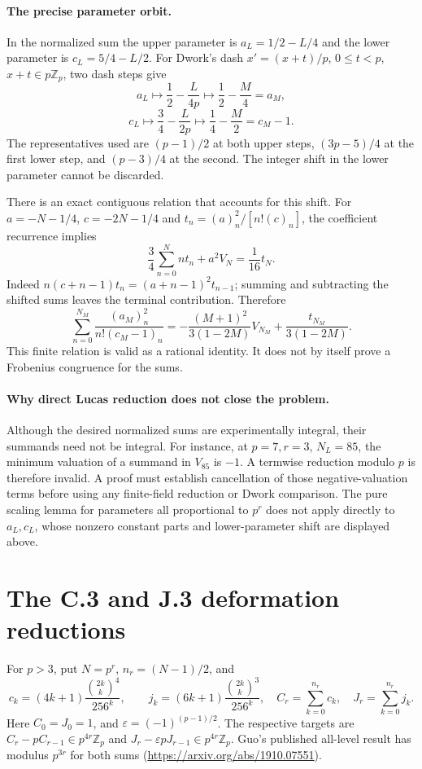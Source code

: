 \documentclass[11pt,letterpaper]{article}
\numberwithin{equation}{section}
\begin{document}
\paragraph{The precise parameter orbit.}
In the normalized sum the upper parameter is
$a_L=1/2-L/4$ and the lower parameter is $c_L=5/4-L/2$.
For Dwork's dash $x'=(x+t)/p$, $0\le t<p$, $x+t\in p\mathbb Z_p$,
two dash steps give
\[
 a_L\longmapsto\frac12-\frac{L}{4p}
     \longmapsto\frac12-\frac{M}{4}=a_M,
\]
\[
 c_L\longmapsto\frac34-\frac{L}{2p}
     \longmapsto\frac14-\frac{M}{2}=c_M-1.
\]
The representatives used are $(p-1)/2$ at both upper steps,
$(3p-5)/4$ at the first lower step, and $(p-3)/4$ at the second.
The integer shift in the lower parameter cannot be discarded.

There is an exact contiguous relation that accounts for this shift.
For $a=-N-1/4$, $c=-2N-1/4$ and
$t_n=(a)_n^2/[n!(c)_n]$, the coefficient recurrence implies
\[
 \frac34\sum_{n=0}^N n t_n+a^2V_N=\frac1{16}t_N.
\]
Indeed $n(c+n-1)t_n=(a+n-1)^2t_{n-1}$; summing and subtracting
the shifted sums leaves the terminal contribution.
Therefore
\begin{equation}\label{II-eq:F-contiguous}
 \sum_{n=0}^{N_M}\frac{(a_M)_n^2}{n!(c_M-1)_n}
 =-\frac{(M+1)^2}{3(1-2M)}V_{N_M}
   +\frac{t_{N_M}}{3(1-2M)}.
\end{equation}
This finite relation is valid as a rational identity. It does not by
itself prove a Frobenius congruence for the sums.

\paragraph{Why direct Lucas reduction does not close the problem.}
Although the desired normalized sums are experimentally integral,
their summands need not be integral. For instance, at $p=7,r=3$,
$N_L=85$, the minimum valuation of a summand in $V_{85}$ is $-1$.
A termwise reduction modulo $p$ is therefore invalid. A proof must
establish cancellation of those negative-valuation terms before using
any finite-field reduction or Dwork comparison. The pure scaling
lemma for parameters all proportional to $p^r$ does not apply directly
to $a_L,c_L$, whose nonzero constant parts and lower-parameter shift
are displayed above.
\section{The C.3 and J.3 deformation reductions}\label{loc-II-7}
For $p>3$, put $N=p^r$, $n_r=(N-1)/2$, and
\[
 c_k=(4k+1)\frac{\binom{2k}{k}^{4}}{256^k},\qquad
 j_k=(6k+1)\frac{\binom{2k}{k}^{3}}{256^k},\quad
 C_r=\sum_{k=0}^{n_r}c_k,\quad J_r=\sum_{k=0}^{n_r}j_k.
\]
Here $C_0=J_0=1$, and $\varepsilon=(-1)^{(p-1)/2}$.
The respective targets are
$C_r-pC_{r-1}\in p^{4r}\mathbb Z_p$ and
$J_r-\varepsilon pJ_{r-1}\in p^{4r}\mathbb Z_p$.
Guo's published all-level result has modulus $p^{3r}$ for both sums
(\url{https://arxiv.org/abs/1910.07551}).
\end{document}
